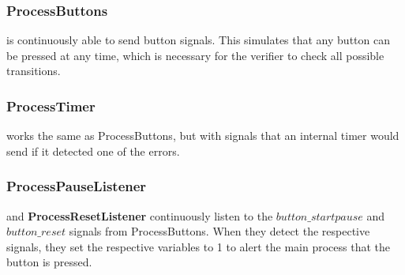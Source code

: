 \documentclass[a4paper,oneside,11pt]{article}
\begin{document}
\subsubsection{ProcessButtons} is continuously able to send button signals. This simulates that any button can be pressed at any time, which is necessary for the verifier to check all possible transitions. 

\subsubsection{ProcessTimer} works the same as ProcessButtons, but with signals that an internal timer would send if it detected one of the errors.

\subsubsection{ProcessPauseListener} and \textbf{ProcessResetListener} continuously listen to the $button\_startpause$ and $button\_reset$ signals from ProcessButtons. When they detect the respective signals, they set the respective variables to 1 to alert the main process that the button is pressed.
\end{document}
